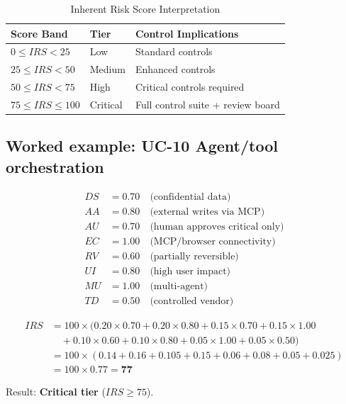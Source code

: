 \begin{table}[htbp]
\centering
\caption{Inherent Risk Score Interpretation}
\label{tab:irs-interpretation}
\begin{tabular}{l l l}
\toprule
\textbf{Score Band} & \textbf{Tier} & \textbf{Control Implications} \\
\midrule
$0 \leq IRS < 25$ & Low & Standard controls \\
$25 \leq IRS < 50$ & Medium & Enhanced controls \\
$50 \leq IRS < 75$ & High & Critical controls required \\
$75 \leq IRS \leq 100$ & Critical & Full control suite + review board \\
\bottomrule
\end{tabular}
\end{table}

\subsection{Worked example: UC-10 Agent/tool orchestration}

\begin{align*}
DS &= 0.70 \quad \text{(confidential data)} \\
AA &= 0.80 \quad \text{(external writes via MCP)} \\
AU &= 0.70 \quad \text{(human approves critical only)} \\
EC &= 1.00 \quad \text{(MCP/browser connectivity)} \\
RV &= 0.60 \quad \text{(partially reversible)} \\
UI &= 0.80 \quad \text{(high user impact)} \\
MU &= 1.00 \quad \text{(multi-agent)} \\
TD &= 0.50 \quad \text{(controlled vendor)}
\end{align*}

\begin{align*}
IRS &= 100 \times (0.20 \times 0.70 + 0.20 \times 0.80 + 0.15 \times 0.70 + 0.15 \times 1.00 \\
    &\quad + 0.10 \times 0.60 + 0.10 \times 0.80 + 0.05 \times 1.00 + 0.05 \times 0.50) \\
    &= 100 \times (0.14 + 0.16 + 0.105 + 0.15 + 0.06 + 0.08 + 0.05 + 0.025) \\
    &= 100 \times 0.77 = \mathbf{77}
\end{align*}

Result: \textbf{Critical tier} ($IRS \geq 75$).

